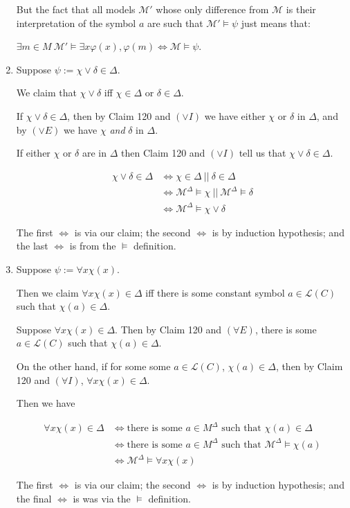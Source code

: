 \documentclass[a4paper]{article}
\newcommand{\MODEL}{\mathcal{M}}
\newcommand{\LANGUAGE}{\mathcal{L}}
\begin{document}
\begin{enumerate}
        But the fact that all models $\MODEL'$ whose only difference from $\MODEL$ is their interpretation of the symbol $a$ are such that $\MODEL' \models \psi$ just means that:

        $\exists m \in M\ \MODEL' \models \exists x \varphi (x), \varphi (m)\Leftrightarrow \MODEL \models \psi$.

    \item Suppose $\psi := \chi \vee \delta \in \Delta$. 
    
    We claim that $\chi \vee \delta$ iff $\chi \in \Delta$ or $\delta \in \Delta$. 
    
    If $\chi \vee \delta \in \Delta$, then by Claim 120 and $(\vee I)$ we have either $\chi$ or $\delta$ in $\Delta$, and by $(\vee E)$ we have $\chi$ \textit{and} $\delta$ in $\Delta$. 
    
    If either $\chi$ or $\delta$ are in $\Delta$ then Claim 120 and $(\vee I)$ tell us that $\chi \vee \delta \in \Delta$.


    \begin{align*}
        \chi \vee \delta \in \Delta & \Leftrightarrow  \chi \in \Delta\ || \ \delta \in \Delta\\
        & \Leftrightarrow \MODEL^{\Delta} \models \chi\ || \ \MODEL^{\Delta} \models \delta\\
        & \Leftrightarrow \MODEL^{\Delta} \models \chi \vee \delta
    \end{align*}

    The first $\Leftrightarrow$ is via our claim; the second $\Leftrightarrow$ is by induction hypothesis; and the last $\Leftrightarrow$ is from the $\models$ definition.

    \item Suppose $\psi := \forall x \chi (x)$. 
    
        Then we claim $\forall x \chi (x) \in \Delta$ iff there is some constant symbol $a \in \LANGUAGE (C)$ such that $\chi(a) \in \Delta$.

        Suppose $\forall x \chi (x) \in \Delta$. Then by Claim 120 and $(\forall E)$, there is some $a \in \LANGUAGE (C)$ such that $\chi(a) \in \Delta$.


        On the other hand, if for some some $a \in \LANGUAGE(C)$, $\chi (a) \in \Delta$, then by Claim 120 and $(\forall I)$, $\forall x \chi (x) \in \Delta$. 

        Then we have

    \begin{align*}
        \forall x \chi (x)\in \Delta & \Leftrightarrow \text{there is some } a \in M^{\Delta} \text{ such that } \chi(a) \in \Delta\\
        & \Leftrightarrow \text{there is some } a \in M^{\Delta} \text{ such that } \MODEL^{\Delta} \models \chi (a)\\
        & \Leftrightarrow \MODEL^{\Delta} \models \forall x \chi (x)
    \end{align*}

    The first $\Leftrightarrow$ is via our claim; the second $\Leftrightarrow$ is by induction hypothesis; and the final $\Leftrightarrow$ is was via the $\models$ definition.

\end{enumerate}
\end{document}
